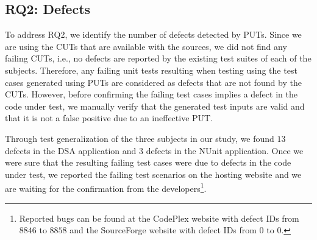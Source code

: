 \subsection{RQ2: Defects}

To address RQ2, we identify the number of defects detected by PUTs. Since we are using the CUTs that are available with the sources, we did not find any failing CUTs, i.e., no defects are reported by the existing test suites of each of the subjects. Therefore, any failing unit tests resulting when testing using the test cases generated using PUTs are considered as defects that are not found by the CUTs. However, before confirming the failing test cases implies a defect in the code under test, we manually verify that the generated test inputs are valid and that it is not a false positive due to an ineffective PUT. 

Through test generalization of the three subjects in our study, we found $13$ defects in the DSA application and $3$ defects in the NUnit application. Once we were sure that the resulting failing test cases were due to defects in the code under test, we reported the failing test scenarios on the hosting website and we are waiting for the confirmation from the developers\footnote{Reported bugs can be found at the CodePlex website with defect IDs from $8846$ to $8858$ and the SourceForge website with defect IDs from $0$ to $0$.}.  


